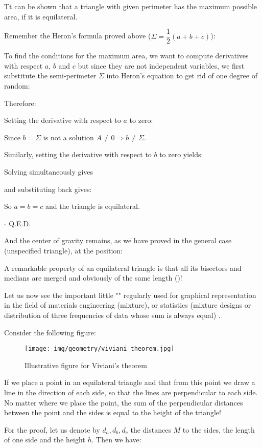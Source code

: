 {	Tt can be shown that a triangle with given perimeter has the maximum possible area, if it is equilateral.
	\begin{dem}
	Remember the Heron's formula proved above ($\Sigma=\dfrac{1}{2}(a+b+c)$):
	
	To find the conditions for the maximum area, we want to compute derivatives with respect $a$, $b$ and $c$ but since they are not independent variables, we first substitute the semi-perimeter $\Sigma$ into Heron's equation to get rid of one degree of random:
	
	Therefore:
	
	Setting the derivative with respect to $a$ to zero:
	
	Since $b=\Sigma$ is not a solution $A\neq 0\Rightarrow b\neq \Sigma$.
	
	Similarly, setting the derivative with respect to $b$ to zero yields:
	
	Solving simultaneously gives
	
	and substituting back gives:
	
	So $a=b=c$ and the triangle is equilateral.
	\begin{flushright}
		$\square$  Q.E.D.
	\end{flushright}
	\end{dem}
	And the center of gravity remains, as we have proved in the general case (unspecified triangle), at the position:
	
	A remarkable property of an equilateral triangle is that all its bisectors and medians are merged and obviously of the same length ()!
	
	Let us now see the important little "" regularly used for graphical representation in the field of materials engineering (mixture), or statistics (mixture designs or distribution of three frequencies of data whose sum is always equal) .
	
	Consider the following figure:
	\begin{figure}[H]
		\centering
		\texttt{[image: img/geometry/viviani\_theorem.jpg]}
		\caption{Illustrative figure for Viviani's theorem}
	\end{figure}
	\begin{theorem}
	If we place a point in an equilateral triangle and that from this point we draw a line in the direction of each side, so that the lines are perpendicular to each side. No matter where we place the point, the sum of the perpendicular distances between the point and the sides is equal to the height of the triangle!
	\end{theorem}
	\begin{dem}
	For the proof, let us denote by $d_a,d_b,d_c$ the distances $M$ to the sides, the length of one side and the height $h$. Then we have:
	

\end{dem}}

